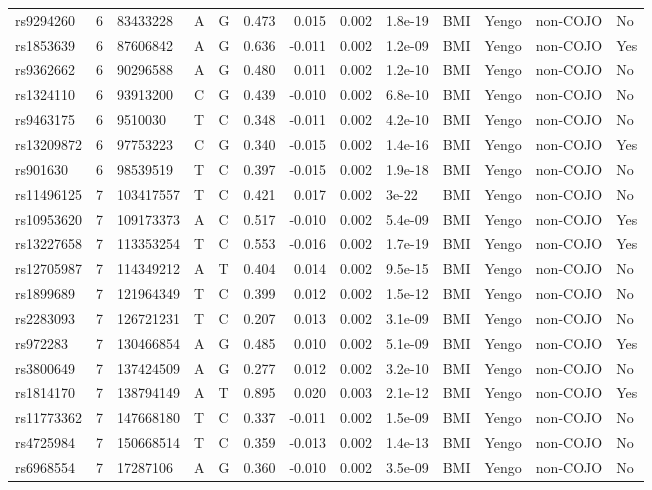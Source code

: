 \documentclass[11pt,twoside]{bristolthesis}
\begin{document}
\begin{longtable}[t]{lrlllrrrlllll}
rs9294260 & 6 & 83433228 & A & G & 0.473 & 0.015 & 0.002 & 1.8e-19 & BMI & Yengo & non-COJO & No\\
rs1853639 & 6 & 87606842 & A & G & 0.636 & -0.011 & 0.002 & 1.2e-09 & BMI & Yengo & non-COJO & Yes\\
\addlinespace
rs9362662 & 6 & 90296588 & A & G & 0.480 & 0.011 & 0.002 & 1.2e-10 & BMI & Yengo & non-COJO & No\\
rs1324110 & 6 & 93913200 & C & G & 0.439 & -0.010 & 0.002 & 6.8e-10 & BMI & Yengo & non-COJO & No\\
rs9463175 & 6 & 9510030 & T & C & 0.348 & -0.011 & 0.002 & 4.2e-10 & BMI & Yengo & non-COJO & No\\
rs13209872 & 6 & 97753223 & C & G & 0.340 & -0.015 & 0.002 & 1.4e-16 & BMI & Yengo & non-COJO & Yes\\
rs901630 & 6 & 98539519 & T & C & 0.397 & -0.015 & 0.002 & 1.9e-18 & BMI & Yengo & non-COJO & No\\
\addlinespace
rs11496125 & 7 & 103417557 & T & C & 0.421 & 0.017 & 0.002 & 3e-22 & BMI & Yengo & non-COJO & No\\
rs10953620 & 7 & 109173373 & A & C & 0.517 & -0.010 & 0.002 & 5.4e-09 & BMI & Yengo & non-COJO & Yes\\
rs13227658 & 7 & 113353254 & T & C & 0.553 & -0.016 & 0.002 & 1.7e-19 & BMI & Yengo & non-COJO & Yes\\
rs12705987 & 7 & 114349212 & A & T & 0.404 & 0.014 & 0.002 & 9.5e-15 & BMI & Yengo & non-COJO & No\\
rs1899689 & 7 & 121964349 & T & C & 0.399 & 0.012 & 0.002 & 1.5e-12 & BMI & Yengo & non-COJO & No\\
\addlinespace
rs2283093 & 7 & 126721231 & T & C & 0.207 & 0.013 & 0.002 & 3.1e-09 & BMI & Yengo & non-COJO & No\\
rs972283 & 7 & 130466854 & A & G & 0.485 & 0.010 & 0.002 & 5.1e-09 & BMI & Yengo & non-COJO & Yes\\
rs3800649 & 7 & 137424509 & A & G & 0.277 & 0.012 & 0.002 & 3.2e-10 & BMI & Yengo & non-COJO & No\\
rs1814170 & 7 & 138794149 & A & T & 0.895 & 0.020 & 0.003 & 2.1e-12 & BMI & Yengo & non-COJO & Yes\\
rs11773362 & 7 & 147668180 & T & C & 0.337 & -0.011 & 0.002 & 1.5e-09 & BMI & Yengo & non-COJO & No\\
\addlinespace
rs4725984 & 7 & 150668514 & T & C & 0.359 & -0.013 & 0.002 & 1.4e-13 & BMI & Yengo & non-COJO & No\\
rs6968554 & 7 & 17287106 & A & G & 0.360 & -0.010 & 0.002 & 3.5e-09 & BMI & Yengo & non-COJO & No\\

\end{longtable}
\end{document}
